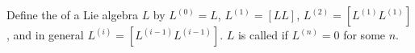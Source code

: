Define the  of a Lie algebra $L$ by $L^{(0)} = L$, $L^{(1)} = [LL]$, $L^{(2)} = [L^{(1)} L^{(1)}]$, and in general $L^{(i)} = [L^{(i-1)} L^{(i-1)}]$. $L$ is called  if $L^{(n)} = 0$ for some $n$.
